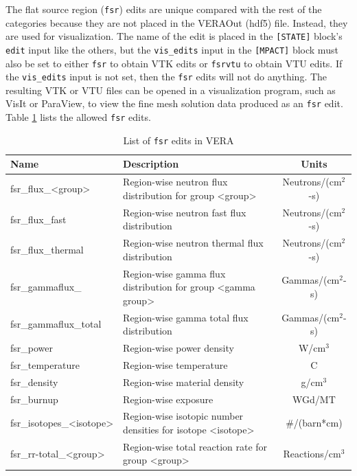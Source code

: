 The flat source region (\texttt{fsr}) edits are unique compared with the rest of the categories because they are not placed in the VERAOut (\ac{hdf5}) file.  Instead, they are used for visualization.  The name of the edit is placed in the \texttt{[STATE]} block's \texttt{edit} input like the others, but the \texttt{vis\_edits} input in the \texttt{[MPACT]} block must also be set to either \texttt{fsr} to obtain VTK edits or \texttt{fsrvtu} to obtain VTU edits.  If the \texttt{vis\_edits} input is not set, then the \texttt{fsr} edits will not do anything.  The resulting VTK or VTU files can be opened in a visualization program, such as VisIt or ParaView, to view the fine mesh solution data produced as an \texttt{fsr} edit.  Table \ref{tab:fsr-edits} lists the allowed \texttt{fsr} edits.

\begin{table}[h]
    \centering
    \caption{List of \texttt{fsr} edits in VERA}
    \label{tab:fsr-edits}
    \begin{tabular}{|l|p{}|c|}\hline
    {\bf Name} & {\bf Description} & {\bf Units} \\\hline
    fsr\_flux\_<group> & Region-wise neutron flux distribution for group <group> & Neutrons/(cm$^2$-s) \\\hline
    fsr\_flux\_fast & Region-wise neutron fast flux distribution & Neutrons/(cm$^2$-s) \\\hline
    fsr\_flux\_thermal & Region-wise neutron thermal flux distribution & Neutrons/(cm$^2$-s) \\\hline
    fsr\_gammaflux\_<gamma group> & Region-wise gamma flux distribution for group <gamma group> & Gammas/(cm$^2$-s) \\\hline
    fsr\_gammaflux\_total & Region-wise gamma total flux distribution & Gammas/(cm$^2$-s) \\\hline
    fsr\_power & Region-wise power density & W/cm$^3$ \\\hline
    fsr\_temperature & Region-wise temperature & C \\\hline
    fsr\_density & Region-wise material density & g/cm$^3$ \\\hline
    fsr\_burnup & Region-wise exposure & WGd/MT \\\hline
    fsr\_isotopes\_<isotope> & Region-wise isotopic number densities for isotope <isotope> & \#/(barn*cm) \\\hline
    fsr\_rr-total\_<group> & Region-wise total reaction rate for group <group> & Reactions/cm$^3$ \\\hline

\end{tabular}
\end{table}
